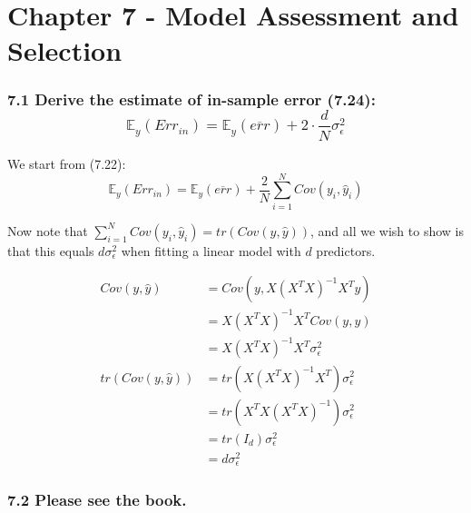 
\chapter{Chapter 7 - Model Assessment and Selection}

\subsection*{7.1 Derive the estimate of in-sample error (7.24): 
$$ \mathbb{E}_y\left(Err_{in}\right) = \mathbb{E}_y\left(\overline{err}\right) + 2 \cdot \frac{d}{N} \sigma_\epsilon^2$$
}

We start from (7.22): 
$$ \mathbb{E}_y\left(Err_{in}\right) = \mathbb{E}_y\left(\overline{err}\right) + \frac{2}{N} \sum_{i=1}^N Cov(y_i, \hat{y}_i)$$

Now note that $\sum_{i=1}^N Cov(y_i, \hat{y}_i) = tr(Cov(y, \hat{y}))$, and all we wish to show is that this equals $d \sigma_\epsilon^2$ when fitting a linear model with $d$ predictors.

\begin{align*}
    Cov(y, \hat{y}) &= Cov(y, X (X^T X)^{-1} X^T y)\\
     &= X (X^T X)^{-1} X^T Cov(y, y)\\
     &= X (X^T X)^{-1} X^T \sigma_\epsilon^2\\
    tr( Cov(y, \hat{y}) ) &= tr( X (X^T X)^{-1} X^T) \sigma_\epsilon^2 \\
    &= tr(  X^T X (X^T X)^{-1}) \sigma_\epsilon^2 \\
    &= tr( I_d) \sigma_\epsilon^2 \\
    &= d \sigma_\epsilon^2 
\end{align*}


\subsection*{7.2 Please see the book.}
